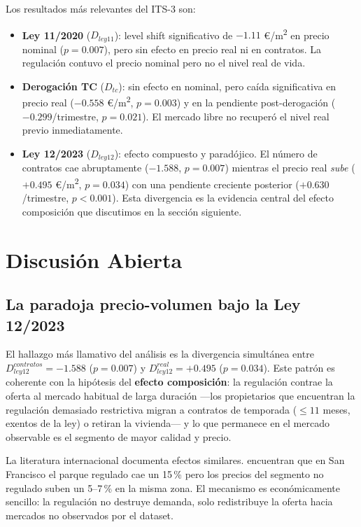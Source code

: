 \documentclass[12pt,a4paper]{article}
\begin{document}
Los resultados más relevantes del ITS-3 son:
\begin{itemize}[itemsep=3pt]
  \item \textbf{Ley 11/2020} ($D_{ley11}$): level shift significativo de $-1.11$
    \euro/m\textsuperscript{2} en precio nominal ($p=0.007$), pero sin efecto
    en precio real ni en contratos. La regulación contuvo el precio nominal pero
    no el nivel real de vida.
  \item \textbf{Derogación TC} ($D_{tc}$): sin efecto en nominal, pero caída
    significativa en precio real ($-0.558$ \euro/m\textsuperscript{2}, $p=0.003$)
    y en la pendiente post-derogación ($-0.299$/trimestre, $p=0.021$). El mercado
    libre no recuperó el nivel real previo inmediatamente.
  \item \textbf{Ley 12/2023} ($D_{ley12}$): efecto compuesto y paradójico.
    El número de contratos cae abruptamente ($-1.588$, $p=0.007$) mientras el
    precio real \textit{sube} ($+0.495$ \euro/m\textsuperscript{2}, $p=0.034$) con
    una pendiente creciente posterior ($+0.630$/trimestre, $p<0.001$). Esta divergencia
    es la evidencia central del efecto composición que discutimos en la sección
    siguiente.
\end{itemize}

\section{Discusión Abierta}
\label{sec:discusion}

\subsection{La paradoja precio-volumen bajo la Ley 12/2023}

El hallazgo más llamativo del análisis es la divergencia simultánea entre
$D_{ley12}^{contratos} = -1.588$ ($p=0.007$) y $D_{ley12}^{real} = +0.495$
($p=0.034$). Este patrón es coherente con la hipótesis del \textbf{efecto composición}:
la regulación contrae la oferta al mercado habitual de larga duración ---los
propietarios que encuentran la regulación demasiado restrictiva migran a contratos de
temporada ($\leq 11$ meses, exentos de la ley) o retiran la vivienda--- y lo que
permanece en el mercado observable es el segmento de mayor calidad y precio.

La literatura internacional documenta efectos similares. \citet{diamond2019rent}
encuentran que en San Francisco el parque regulado cae un 15\,\% pero los precios
del segmento no regulado suben un 5--7\,\% en la misma zona. El mecanismo es
económicamente sencillo: la regulación no destruye demanda, solo redistribuye la
oferta hacia mercados no observados por el dataset.
\end{document}
